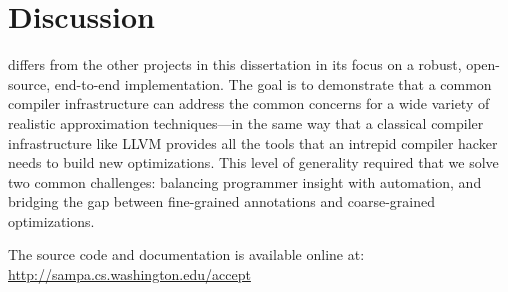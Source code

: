 \section{Discussion}

\sysname differs from the other projects in this dissertation in its focus on a
robust, open-source, end-to-end implementation.
The goal is to demonstrate that a common compiler infrastructure can address
the common concerns for a wide variety of realistic approximation
techniques---in the same way that a classical compiler infrastructure like
LLVM provides all the tools that an intrepid compiler hacker needs to build
new optimizations.
This level of generality required that we solve two common challenges:
balancing programmer insight with automation,
and bridging the gap between fine-grained annotations and coarse-grained
optimizations.

The \sysname source code and documentation is available online at: \\
\url{http://sampa.cs.washington.edu/accept}
